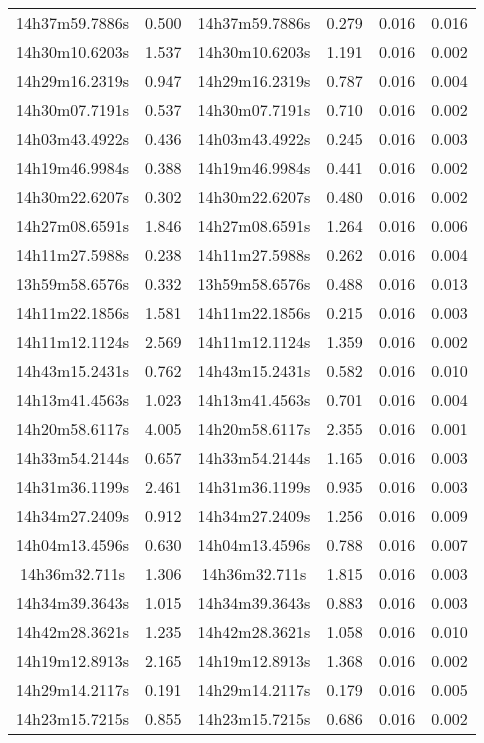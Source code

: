 \begin{table}
\begin{tabular}{cccccc}
14h37m59.7886s & 0.500 & 14h37m59.7886s & 0.279 & 0.016 & 0.016 \\
14h30m10.6203s & 1.537 & 14h30m10.6203s & 1.191 & 0.016 & 0.002 \\
14h29m16.2319s & 0.947 & 14h29m16.2319s & 0.787 & 0.016 & 0.004 \\
14h30m07.7191s & 0.537 & 14h30m07.7191s & 0.710 & 0.016 & 0.002 \\
14h03m43.4922s & 0.436 & 14h03m43.4922s & 0.245 & 0.016 & 0.003 \\
14h19m46.9984s & 0.388 & 14h19m46.9984s & 0.441 & 0.016 & 0.002 \\
14h30m22.6207s & 0.302 & 14h30m22.6207s & 0.480 & 0.016 & 0.002 \\
14h27m08.6591s & 1.846 & 14h27m08.6591s & 1.264 & 0.016 & 0.006 \\
14h11m27.5988s & 0.238 & 14h11m27.5988s & 0.262 & 0.016 & 0.004 \\
13h59m58.6576s & 0.332 & 13h59m58.6576s & 0.488 & 0.016 & 0.013 \\
14h11m22.1856s & 1.581 & 14h11m22.1856s & 0.215 & 0.016 & 0.003 \\
14h11m12.1124s & 2.569 & 14h11m12.1124s & 1.359 & 0.016 & 0.002 \\
14h43m15.2431s & 0.762 & 14h43m15.2431s & 0.582 & 0.016 & 0.010 \\
14h13m41.4563s & 1.023 & 14h13m41.4563s & 0.701 & 0.016 & 0.004 \\
14h20m58.6117s & 4.005 & 14h20m58.6117s & 2.355 & 0.016 & 0.001 \\
14h33m54.2144s & 0.657 & 14h33m54.2144s & 1.165 & 0.016 & 0.003 \\
14h31m36.1199s & 2.461 & 14h31m36.1199s & 0.935 & 0.016 & 0.003 \\
14h34m27.2409s & 0.912 & 14h34m27.2409s & 1.256 & 0.016 & 0.009 \\
14h04m13.4596s & 0.630 & 14h04m13.4596s & 0.788 & 0.016 & 0.007 \\
14h36m32.711s & 1.306 & 14h36m32.711s & 1.815 & 0.016 & 0.003 \\
14h34m39.3643s & 1.015 & 14h34m39.3643s & 0.883 & 0.016 & 0.003 \\
14h42m28.3621s & 1.235 & 14h42m28.3621s & 1.058 & 0.016 & 0.010 \\
14h19m12.8913s & 2.165 & 14h19m12.8913s & 1.368 & 0.016 & 0.002 \\
14h29m14.2117s & 0.191 & 14h29m14.2117s & 0.179 & 0.016 & 0.005 \\
14h23m15.7215s & 0.855 & 14h23m15.7215s & 0.686 & 0.016 & 0.002 \\

\end{tabular}
\end{table}
